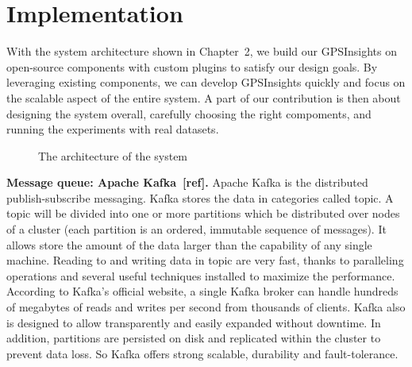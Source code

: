 \documentclass{acm_proc_article-sp}
\begin{document}
\section{Implementation} 

With the system architecture shown in Chapter~2, we build our GPSInsights on open-source components with custom plugins to satisfy our design goals. By leveraging existing components, we can develop GPSInsights quickly and focus on the scalable aspect of the entire system. A part of our contribution is then about designing the system overall,  carefully choosing the right compoments, and running the experiments with real datasets. 

\begin{figure}[!htb]
\centering
{}
\caption{The architecture of the system}
\end{figure}

\textbf{Message queue: Apache Kafka~[ref].} Apache Kafka is the distributed publish-subscribe messaging. Kafka stores the data in categories called topic. A topic will be divided into one or more partitions which be distributed over nodes of a cluster (each partition is an ordered, immutable sequence of messages). It allows store the amount of the data larger than the capability of any single machine.
Reading to and writing data in topic are very fast, thanks to paralleling operations and several useful techniques installed to maximize the performance. According to Kafka's official website, a single Kafka broker can handle hundreds of megabytes of reads and writes per second from thousands of clients.
Kafka also is designed to allow transparently and easily expanded without downtime. In addition, partitions are persisted on disk and replicated within the cluster to prevent data loss. So Kafka offers strong scalable, durability and  fault-tolerance.
\end{document}
